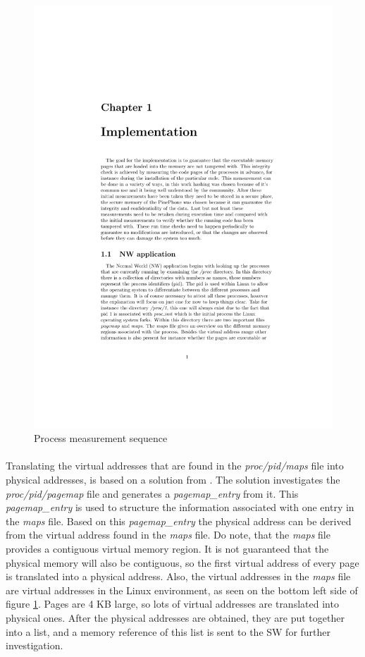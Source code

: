 \begin{figure}[h]
\centering
\includegraphics[width=\textwidth]{implementation}
\caption{Process measurement sequence}
\label{implementation}
\end{figure}

\paragraph*{}
Translating the virtual addresses that are found in the \textit{proc/pid/maps} file into physical addresses, is based on a solution from \cite{cirosantilli}. The solution investigates the \textit{proc/pid/pagemap} file and generates a \textit{pagemap\_entry} from it. This \textit{pagemap\_entry} is used to structure the information associated with one entry in the \textit{maps} file. Based on this \textit{pagemap\_entry} the physical address can be derived from the virtual address found in the \textit{maps} file. Do note, that the \textit{maps} file provides a contiguous virtual memory region. It is not guaranteed that the physical memory will also be contiguous, so the first virtual address of every page is translated into a physical address. Also, the virtual addresses in the \textit{maps} file are virtual addresses in the Linux environment, as seen on the bottom left side of figure \ref{implementation}. Pages are 4 KB large, so lots of virtual addresses are translated into physical ones. After the physical addresses are obtained, they are put together into a list, and a memory reference of this list is sent to the SW for further investigation.

